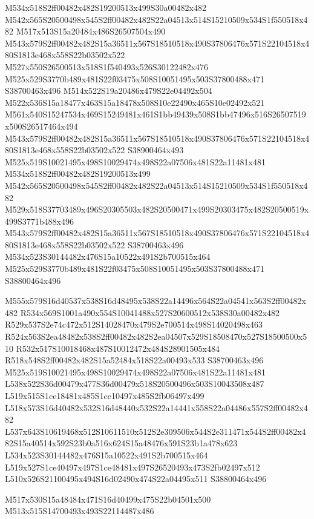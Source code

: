 \documentclass{article}
\begin{document}
\begin{multicols}{2}
M534x518S2ff00482x482S19200513x499S30a00482x482 M542x565S20500498x545S2ff00482x482S22a04513x514S15210509x534S1f550518x482 M517x513S15a20484x486S26507504x490 M543x579S2ff00482x482S15a36511x567S18510518x490S37806476x571S22104518x480S1813e468x558S22b03502x522 M527x550S26500513x518S1f540493x526S30122482x476 M525x529S3770b489x481S22f03475x508S10051495x503S37800488x471 S38700463x496 M514x522S19a20486x479S22e04492x504 M522x536S15a18477x463S15a18478x508S10e22490x465S10e02492x521 M561x540S15247534x469S15249481x461S1bb49439x508S1bb47496x516S26507519x500S26517464x494 M543x579S2ff00482x482S15a36511x567S18510518x490S37806476x571S22104518x480S1813e468x558S22b03502x522 S38900464x493 M525x519S10021495x498S10029474x498S22a07506x481S22a11481x481 M534x518S2ff00482x482S19200513x499 M542x565S20500498x545S2ff00482x482S22a04513x514S15210509x534S1f550518x482 M529x518S37703489x496S20305503x482S20500471x499S20303475x482S20500519x499S3771b488x496 M543x579S2ff00482x482S15a36511x567S18510518x490S37806476x571S22104518x480S1813e468x558S22b03502x522 S38700463x496 M534x523S30144482x476S15a10522x491S2b700515x464 M525x529S3770b489x481S22f03475x508S10051495x503S37800488x471 S38800464x496

M555x579S16d40537x538S16d48495x538S22a14496x564S22a04541x563S2ff00482x482 R534x569S1001a490x554S10041488x527S20600512x538S30a00482x482 R529x537S2e74c472x512S14028470x479S2e700514x498S14020498x463 R524x563S2ea48482x538S2ff00482x482S2ea04507x529S18508470x527S18500500x510 R532x517S10018468x487S10012472x484S28901505x484 R518x548S2ff00482x482S15a52484x518S22a00493x533 S38700463x496 M525x519S10021495x498S10029474x498S22a07506x481S22a11481x481 L538x522S36d00479x477S36d00479x518S20500496x503S10043508x487 L519x515S1ce18481x485S1ce10497x485S2fb06497x499 L518x573S16d40482x532S16d48440x532S22a14441x558S22a04486x557S2ff00482x482 L537x643S10619468x512S10611510x512S2e309506x544S2e311471x544S2ff00482x482S15a40514x592S23b0a516x624S15a48476x591S23b1a478x623 L534x523S30144482x476S15a10522x491S2b700515x464 L519x527S1ce40497x497S1ce48481x497S26520493x473S2fb02497x512 L510x526S21100495x494S16d02490x474S22a04495x511 S38800464x496

\begin{center}
M517x530S15a48484x471S16d40499x475S22b04501x500 M513x515S14700493x493S22114487x486 
\end{center}



\end{multicols}
\end{document}

